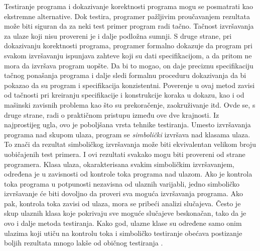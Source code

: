 \documentclass[a4paper]{article}
\begin{document}
Testiranje programa i dokazivanje korektnosti programa mogu se posmatrati kao ekstremne alternative. Dok testira, programer pažljivim proučavanjem rezultata može biti siguran da za neki test primer program radi tačno. Tačnost izvršavanja za ulaze koji nisu provereni je i dalje podložna sumnji. S druge strane, pri dokazivanju korektnosti programa, programer formalno dokazuje da program pri svakom izvršavanju ispunjava zahteve koji su dati specifikacijom, a da pritom ne mora da izvršava program uopšte. Da bi to mogao, on daje preciznu specifikaciju tačnog ponašanja programa i dalje sledi formalnu proceduru dokazivanja da bi pokazao da su program i specifikacija konzistentni. Poverenje u ovaj metod zavisi od tačnosti pri kreiranju specifikacije i konstrukcije koraka u dokazu, kao i od mašinski zavisnih problema kao što su prekoračenje, zaokruživanje itd. Ovde se, s druge strane, radi o praktičnom pristupu između ove dve krajnosti. Iz najprostijeg ugla, ovo je poboljšana vrsta tehnike testiranja. Umesto izvršavanja programa nad skupom ulaza, program se \textit{simbolički} izvršava nad klasama ulaza. To znači da rezultat simboličkog izvršavanja može biti ekvivalentan velikom broju uobičajenih test primera. I ovi rezultati svakako mogu biti provereni od strane programera. Klasa ulaza, okarakterisana svakim simboličkim izvršavanjem, određena je u zavisnosti od kontrole toka programa nad ulazom. Ako je kontrola toka programa u potpunosti nezavisna od ulaznih varijabli, jedno simboličko izvršavanje će biti dovoljno da proveri sva moguća izvršavanja programa. Ako pak, kontrola toka zavisi od ulaza, mora se pribeći analizi slučajeva. Često je skup ulaznih klasa koje pokrivaju sve moguće slučajeve beskonačan, tako da je ovo i dalje metoda testiranja. Kako god, ulazne klase su određene samo onim ulazima koji utiču na kontrolu toka i simboličko testiranje obećava postizanje boljih rezultata mnogo lakše od običnog testiranja \cite{simbExec}.\\
\end{document}
